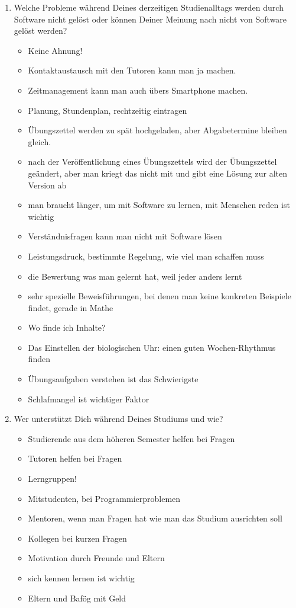 \documentclass{article}
\begin{document}
\begin{enumerate}
\item Welche Probleme während Deines derzeitigen Studienalltags werden durch Software nicht gelöst oder können Deiner Meinung nach nicht von Software gelöst werden?
\begin{itemize}
\item Keine Ahnung!
\item Kontaktaustausch mit den Tutoren kann man ja machen.
\item Zeitmanagement kann man auch übers Smartphone machen.
\item Planung, Stundenplan, rechtzeitig eintragen
\item Übungszettel werden zu spät hochgeladen, aber Abgabetermine bleiben gleich.
\item nach der Veröffentlichung eines Übungszettels wird der Übungszettel geändert, aber man kriegt das nicht mit und gibt eine Lösung zur alten Version ab
\item man braucht länger, um mit Software zu lernen, mit Menschen reden ist wichtig
\item Verständnisfragen kann man nicht mit Software lösen
\item Leistungsdruck, bestimmte Regelung, wie viel man schaffen muss
\item die Bewertung was man gelernt hat, weil jeder anders lernt
\item sehr spezielle Beweisführungen, bei denen man keine konkreten Beispiele findet, gerade in Mathe
\item Wo finde ich Inhalte?
\item Das Einstellen der biologischen Uhr: einen guten Wochen-Rhythmus finden
\item Übungsaufgaben verstehen ist das Schwierigste
\item Schlafmangel ist wichtiger Faktor
\end{itemize}

\item Wer unterstützt Dich während Deines Studiums und wie?
\begin{itemize}
\item Studierende aus dem höheren Semester helfen bei Fragen
\item Tutoren helfen bei Fragen
\item Lerngruppen!
\item Mitstudenten, bei Programmierproblemen
\item Mentoren, wenn man Fragen hat wie man das Studium ausrichten soll
\item Kollegen bei kurzen Fragen
\item Motivation durch Freunde und Eltern
\item sich kennen lernen ist wichtig
\item Eltern und Bafög mit Geld
\end{itemize}


\end{enumerate}
\end{document}
